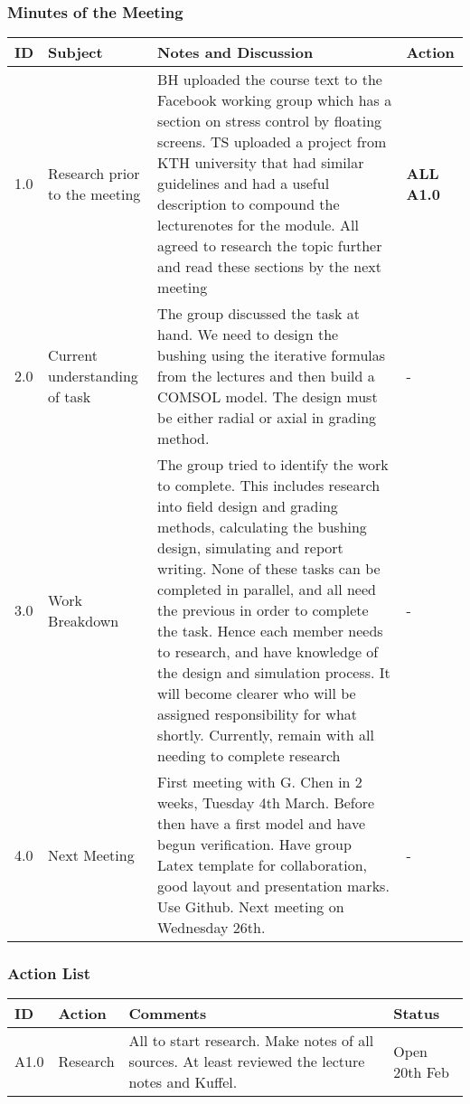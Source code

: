 \subsubsection{Minutes of the Meeting}
\begin{center}
\begin{longtable}{| p{} |>{\raggedright\arraybackslash}p{} | p{} |>{\raggedright\arraybackslash}p{}|} \hline
\textbf{ID} & \textbf{Subject} & \textbf{Notes and Discussion} & \textbf{Action} \\ \hline
\endhead
1.0	&	Research prior to the meeting	&	BH uploaded the course text to the Facebook working group which has a section on stress control by floating screens. TS uploaded a project from KTH university that had similar guidelines and had a useful description to compound the lecturenotes for the module. All agreed to research the topic further and read these sections by the next meeting	&  \textbf{ALL A1.0}	 \\ \hline
2.0	&	Current understanding of task	&	The group discussed the task at hand. We need to design the bushing using the iterative formulas from the lectures and then build a COMSOL model. The design must be either radial or axial in grading method.	& -	 \\ \hline
3.0 	& 	Work Breakdown &	The group tried to identify the work to complete. This includes research into field design and grading methods, calculating the bushing design, simulating and report writing. None of these tasks can be completed in parallel, and all need the previous in order to complete the task. Hence each member needs to research, and have knowledge of the design and simulation process. It will become clearer who will be assigned responsibility for what shortly. Currently, remain with all needing to complete research & - \\ \hline
4.0	&	Next Meeting	&	First meeting with G. Chen in 2 weeks, Tuesday 4th March. Before then have a first model and have begun verification. Have group Latex template for collaboration, good layout and presentation marks. Use Github. Next meeting on Wednesday 26th. & - \\ \hline

\end{longtable}
\end{center}

\subsubsection{Action List}
\begin{center}
\begin{longtable}{| p{} | >{\raggedright\arraybackslash}p{} |  p{} | >{\raggedright\arraybackslash}p{}|} \hline
\textbf{ID} & \textbf{Action} & \textbf{Comments} & \textbf{Status} \\ \hline
\endhead
A1.0	&	Research	&	All to start research. Make notes of all sources. At least reviewed the lecture notes and Kuffel.	& Open 20th Feb \\ \hline	
\end{longtable}
\end{center}

